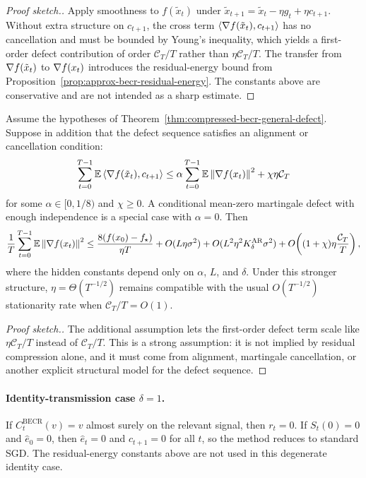 \begin{proof}[Proof sketch.]
Apply smoothness to $f(\tilde x_t)$ under
$\tilde x_{t+1}=\tilde x_t-\eta g_t+\eta c_{t+1}$. Without extra structure on
$c_{t+1}$, the cross term
$\langle \nabla f(\tilde x_t), c_{t+1}\rangle$ has no cancellation and must be
bounded by Young's inequality, which yields a first-order defect contribution
of order $\mathcal C_T/T$ rather than $\eta\mathcal C_T/T$. The transfer from
$\nabla f(\tilde x_t)$ to $\nabla f(x_t)$ introduces the residual-energy bound
from Proposition~\ref{prop:approx-becr-residual-energy}. The constants above
are conservative and are not intended as a sharp estimate.
\end{proof}

\begin{theorem}
\label{thm:compressed-becr-aligned-defect}
Assume the hypotheses of
Theorem~\ref{thm:compressed-becr-general-defect}. Suppose in addition that the
defect sequence satisfies an alignment or cancellation condition:
\[
\sum_{t=0}^{T-1}\mathbb{E}\left\langle \nabla f(\tilde x_t), c_{t+1} \right\rangle
\le
\alpha \sum_{t=0}^{T-1}\mathbb{E}\left\lVert \nabla f(x_t) \right\rVert^2
+
\chi \eta \mathcal C_T
\]
for some $\alpha\in[0,1/8)$ and $\chi\ge 0$. A conditional mean-zero
martingale defect with enough independence is a special case with $\alpha=0$.
Then
\[
\frac{1}{T}\sum_{t=0}^{T-1}\mathbb{E}\left\lVert \nabla f(x_t) \right\rVert^2
\le
\frac{8(f(x_0)-f_\star)}{\eta T}
+
O(L\eta\sigma^2)
+
O(L^2\eta^2K_{\delta}^{\mathrm{AR}}\sigma^2)
+
O\!\left((1+\chi)\eta \frac{\mathcal C_T}{T}\right),
\]
where the hidden constants depend only on $\alpha$, $L$, and $\delta$. Under
this stronger structure, $\eta=\Theta(T^{-1/2})$ remains compatible with the
usual $O(T^{-1/2})$ stationarity rate when $\mathcal C_T/T=O(1)$.
\end{theorem}

\begin{proof}[Proof sketch.]
The additional assumption lets the first-order defect term scale like
$\eta\mathcal C_T/T$ instead of $\mathcal C_T/T$. This is a strong
assumption: it is not implied by residual compression alone, and it must come
from alignment, martingale cancellation, or another explicit structural model
for the defect sequence.
\end{proof}

\paragraph{Identity-transmission case \texorpdfstring{$\delta=1$}{delta=1}.}
If $C_t^{\mathrm{BECR}}(v)=v$ almost surely on the relevant signal, then
$r_t=0$. If $S_t(0)=0$ and $\hat e_0=0$, then $\hat e_t=0$ and
$c_{t+1}=0$ for all $t$, so the method reduces to standard SGD. The
residual-energy constants above are not used in this degenerate identity case.

